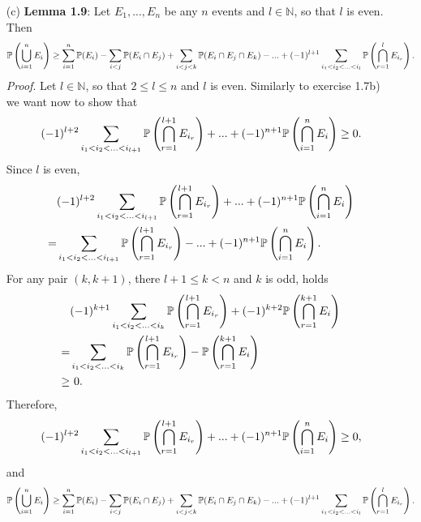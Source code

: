 \begin{enumerate}
  \item[(c)] \textbf{Lemma 1.9}: Let $E_1,...,E_n$ be any $n$ events and $l \in
  \mathbb{N}$, so that $l$ is even. Then
  \[
    \mathbb{P}\left(\bigcup_{i=1}^n E_i\right)
    \geq \sum_{i=1}^n \mathbb{P}(E_i) - \sum_{i<j}\mathbb{P}(E_i \cap E_j) + \sum_{i<j<k}\mathbb{P}(E_i \cap E_j \cap E_k) - ... + (-1)^{l+1} \sum_{i_1<i_2< ... <i_l} \mathbb{P}\left(\bigcap_{r=1}^lE_{i_r}\right).
  \]
  \textit{Proof}. Let $l \in \mathbb{N}$, so that $2 \leq l \leq n$ and $l$ is even. Similarly to exercise 1.7b) we want now to show that
  \[
    (-1)^{l+2} \sum_{i_1<i_2< ... <i_{l+1}} \mathbb{P}\left(\bigcap_{r=1}^{l+1} E_{i_r}\right)
    + ... + (-1)^{n+1} \mathbb{P}\left(\bigcap_{i=1}^n E_{i}\right) \geq 0.
  \]
  Since $l$ is even,
  \begin{align*}
      &(-1)^{l+2} \sum_{i_1<i_2< ... <i_{l+1}} \mathbb{P}\left(\bigcap_{r=1}^{l+1} E_{i_r}\right) + ... + (-1)^{n+1} \mathbb{P}\left(\bigcap_{i=1}^n E_{i}\right) \\
    = &\sum_{i_1<i_2< ... <i_{l+1}} \mathbb{P}\left(\bigcap_{r=1}^{l+1} E_{i_r}\right)
      - ... + (-1)^{n+1} \mathbb{P}\left(\bigcap_{i=1}^n E_{i}\right).
  \end{align*}
  For any pair $(k,k+1)$, there $l+1 \leq k < n$ and $k$ is odd, holds
  \begin{align*}
    \   &(-1)^{k+1} \sum_{i_1<i_2< ... <i_{k}} \mathbb{P}\left(\bigcap_{r=1}^{l+1} E_{i_r}\right) + (-1)^{k+2} \mathbb{P}\left( \bigcap_{r=1}^{k+1} E_{i} \right) \\
    =   &\sum_{i_1<i_2< ... <i_k} \mathbb{P}\left( \bigcap_{r=1}^{l+1} E_{i_r} \right) - \mathbb{P}\left(\bigcap_{r=1}^{k+1} E_{i}\right) \\
    \geq &\ 0.
  \end{align*}
  Therefore,
  \[
    (-1)^{l+2} \sum_{i_1<i_2< ... <i_{l+1}} \mathbb{P}\left(\bigcap_{r=1}^{l+1} E_{i_r}\right)
    + ... + (-1)^{n+1} \mathbb{P}\left(\bigcap_{i=1}^n E_{i}\right) \geq 0,
  \]
  and
  \[
    \mathbb{P}\left(\bigcup_{i=1}^n E_i\right)
    \geq \sum_{i=1}^n \mathbb{P}(E_i) - \sum_{i<j}\mathbb{P}(E_i \cap E_j) + \sum_{i<j<k}\mathbb{P}(E_i \cap E_j \cap E_k) - ... + (-1)^{l+1} \sum_{i_1<i_2< ... <i_l} \mathbb{P}\left(\bigcap_{r=1}^lE_{i_r}\right).
  \]

\end{enumerate}
